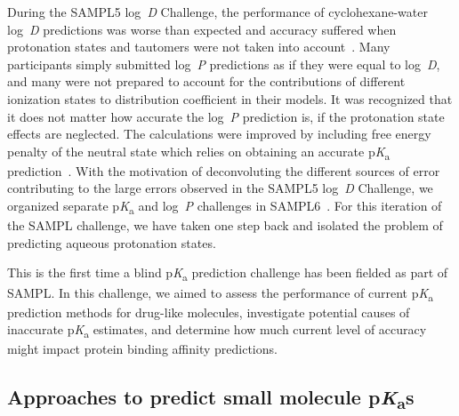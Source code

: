 \documentclass[9pt,lineno,final]{elife}
\newcommand{\pKa}{p\textit{K}\textsubscript{a}}
\newcommand{\logD}{log~\textit{D}}
\newcommand{\logP}{log~\textit{P}}
\begin{document}
During the SAMPL5 \logD{} Challenge, the performance of cyclohexane-water \logD{} predictions was worse than expected and accuracy suffered when protonation states and tautomers were not taken into account~\citep{Pickard:2016:J.Comput.AidedMol.Des., Bannan:2018:J.Comput.AidedMol.Des.}. 
Many participants simply submitted \logP{} predictions as if they were equal to \logD{}, and many were not prepared to account for the contributions of different ionization states to distribution coefficient in their models. 
It was recognized that it does not matter how accurate the \logP{} prediction is, if the protonation state effects are neglected.
The calculations were improved by including free energy penalty of the neutral state which relies on obtaining an accurate \pKa{} prediction~\citep{Pickard:2016:J.Comput.AidedMol.Des}.
With the motivation of deconvoluting the different sources of error contributing to the large errors observed in the SAMPL5 \logD{} Challenge, we organized separate \pKa{} and \logP{} challenges in SAMPL6~\citep{Isik:2018:J.Comput.AidedMol.Des., Isik:2020:J.Comput.AidedMol.Des., Isik:2020:J.Comput.AidedMol.Des.a}. For this iteration of the SAMPL challenge, we have taken one step back and isolated the problem of predicting aqueous protonation states. 

This is the first time a blind \pKa{} prediction challenge has been fielded as part of SAMPL. 
In this challenge, we aimed to assess the performance of current \pKa{} prediction methods for drug-like molecules, investigate potential causes of inaccurate \pKa{} estimates, and determine how much current level of accuracy might impact protein binding affinity predictions. 


\subsection{Approaches to predict small molecule \pKa{}s}
\end{document}
